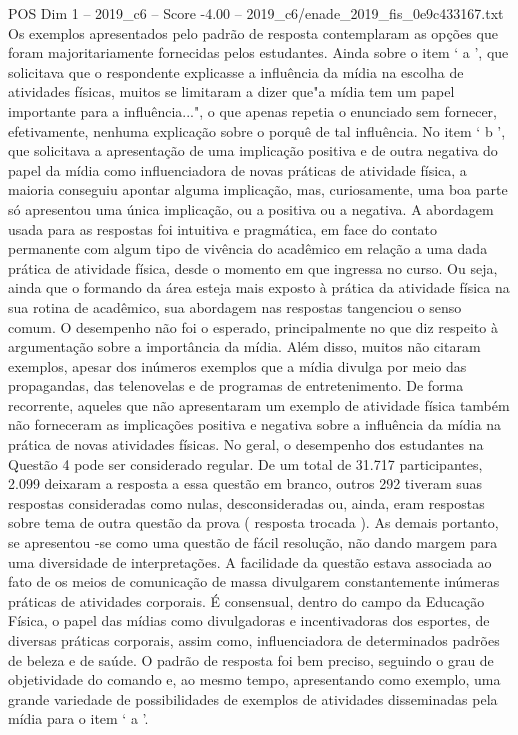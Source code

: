 \begin{textsample}{POS Dim 1 – 2019\_c6 – Score -4.00 – 2019\_c6/enade\_2019\_fis\_0e9c433167.txt}
Os exemplos apresentados pelo padrão de resposta contemplaram as opções que foram majoritariamente fornecidas pelos estudantes.
Ainda sobre o item ‘ a ’, que solicitava que o respondente explicasse a influência da mídia na escolha de atividades físicas, muitos se limitaram a dizer que"a mídia tem um papel importante para a influência...", o que apenas repetia o enunciado sem fornecer, efetivamente, nenhuma explicação sobre o porquê de tal influência.
No item ‘ b ’, que solicitava a apresentação de uma implicação positiva e de outra negativa do papel da mídia como influenciadora de novas práticas de atividade física, a maioria conseguiu apontar alguma implicação, mas, curiosamente, uma boa parte só apresentou uma única implicação, ou a positiva ou a negativa.
A abordagem usada para as respostas foi intuitiva e pragmática, em face do contato permanente com algum tipo de vivência do acadêmico em relação a uma dada prática de atividade física, desde o momento em que ingressa no curso.
Ou seja, ainda que o formando da área esteja mais exposto à prática da atividade física na sua rotina de acadêmico, sua abordagem nas respostas tangenciou o senso comum.
O desempenho não foi o esperado, principalmente no que diz respeito à argumentação sobre a importância da mídia.
Além disso, muitos não citaram exemplos, apesar dos inúmeros exemplos que a mídia divulga por meio das propagandas, das telenovelas e de programas de entretenimento.
De forma recorrente, aqueles que não apresentaram um exemplo de atividade física também não forneceram as implicações positiva e negativa sobre a influência da mídia na prática de novas atividades físicas.
No geral, o desempenho dos estudantes na Questão 4 pode ser considerado regular.
De um total de 31.717 participantes, 2.099 deixaram a resposta a essa questão em branco, outros 292 tiveram suas respostas consideradas como nulas, desconsideradas ou, ainda, eram respostas sobre tema de outra questão da prova ( resposta trocada ).
As demais portanto, se apresentou -se como uma questão de fácil resolução, não dando margem para uma diversidade de interpretações.
A facilidade da questão estava associada ao fato de os meios de comunicação de massa divulgarem constantemente inúmeras práticas de atividades corporais.
É consensual, dentro do campo da Educação Física, o papel das mídias como divulgadoras e incentivadoras dos esportes, de diversas práticas corporais, assim como, influenciadora de determinados padrões de beleza e de saúde.
O padrão de resposta foi bem preciso, seguindo o grau de objetividade do comando e, ao mesmo tempo, apresentando como exemplo, uma grande variedade de possibilidades de exemplos de atividades disseminadas pela mídia para o item ‘ a ’.

\end{textsample}
